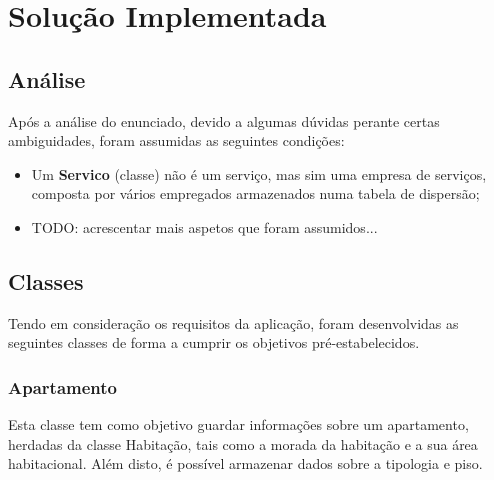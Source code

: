 \documentclass[a4paper]{article}
\begin{document}




\newpage

\section{Solução Implementada}

\subsection{Análise}

Após a análise do enunciado, devido a algumas dúvidas perante certas ambiguidades, foram assumidas as seguintes condições:

\begin{itemize}

	\item Um \textbf{Servico} (classe) não é um serviço, mas sim uma empresa de serviços, composta por vários empregados armazenados numa tabela de dispersão;
	\item TODO: acrescentar mais aspetos que foram assumidos...

\end{itemize}

\subsection{Classes}

Tendo em consideração os requisitos da aplicação, foram desenvolvidas as seguintes classes de forma a cumprir os objetivos pré-estabelecidos.

\subsubsection{Apartamento}

Esta classe tem como objetivo guardar informações sobre um apartamento, herdadas da classe Habitação, tais como a morada da habitação e a sua área habitacional. Além disto, é possível armazenar dados sobre a tipologia e piso.
\end{document}
